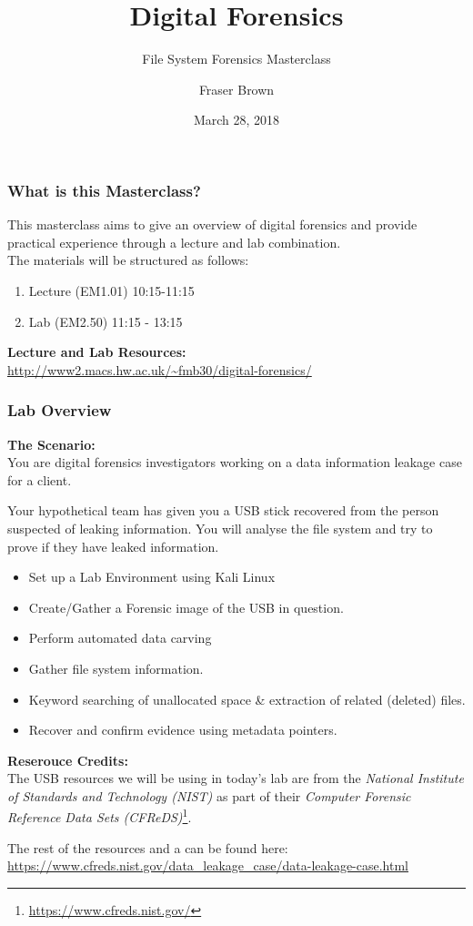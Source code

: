\documentclass{beamer}
\title{Digital Forensics}
\subtitle{File System Forensics Masterclass}
\author{Fraser Brown}
\institute{Heriot-Watt University}
\date{March 28, 2018}
\begin{document}
\begin{frame}
\titlepage
\end{frame}

\begin{frame}
\frametitle{What is this Masterclass?}
This masterclass aims to give an overview of digital forensics and provide practical experience through a lecture and lab combination.\\
\vspace{\baselineskip}
The materials will be structured as follows:
\begin{enumerate}
	\item Lecture (EM1.01) 10:15-11:15
	\item Lab (EM2.50) 11:15 - 13:15
\end{enumerate}
\vspace{\baselineskip}
\textbf{Lecture and Lab Resources:} \\

\url{http://www2.macs.hw.ac.uk/~fmb30/digital-forensics/}
\end{frame}

\begin{frame}[allowframebreaks]
\frametitle{Lab Overview}
\textbf{The Scenario:}\\
You are digital forensics investigators working on a data information leakage case for a client.\\
\vspace{\baselineskip}

Your hypothetical team has given you a USB stick recovered from the person suspected of leaking information. You will analyse the file system and try to prove if they have leaked information.\\


\begin{itemize}
	\item Set up a Lab Environment using Kali Linux
	\item Create/Gather a Forensic image of the USB in question.
	\item Perform automated data carving
	\item Gather file system information.
	\item Keyword searching of unallocated space {\&} extraction of related (deleted) files.
	\item Recover and confirm evidence using metadata pointers.
\end{itemize}

\textbf{Reserouce Credits:}\\
The USB resources we will be using in today's lab are from the \textit{National Institute of Standards and Technology (NIST)} as part of their \textit{Computer Forensic Reference Data Sets (CFReDS)}\footnote{\url{https://www.cfreds.nist.gov/}}.\\
\vspace{\baselineskip}

The rest of the resources and a can be found here:\\
\url{https://www.cfreds.nist.gov/data_leakage_case/data-leakage-case.html}
\end{frame}
\end{document}
